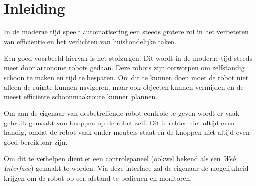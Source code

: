 
\section{Inleiding}
\label{sec:inleiding}
In de moderne tijd speelt automatisering een steeds grotere rol in het
verbeteren van efficiëntie en het verlichten van huishoudelijke taken.

Een goed voorbeeld hiervan is het stofzuigen. Dit wordt in de moderne tijd
steeds meer door autonome robots gedaan. Deze robots zijn ontworpen om zelfstandig
schoon te maken en tijd te besparen. Om dit te kunnen doen moet de robot niet
alleen de ruimte kunnen navigeren, maar ook objecten kunnen vermijden en de
meest efficiënte schoonmaakroute kunnen plannen.

Om aan de eigenaar van desbetreffende robot controle te geven wordt er vaak gebruik
gemaakt van knoppen op de robot zelf. Dit is echter niet altijd even handig, omdat
de robot vaak onder meubels staat en de knoppen niet altijd even goed bereikbaar zijn.

Om dit te verhelpen dient er een controlepaneel (ookwel bekend als een
\textit{Web Interface}) gemaakt te worden. Via deze interface
zal de eigenaar de mogelijkheid krijgen om de robot op een afstand
te bedienen en monitoren.
